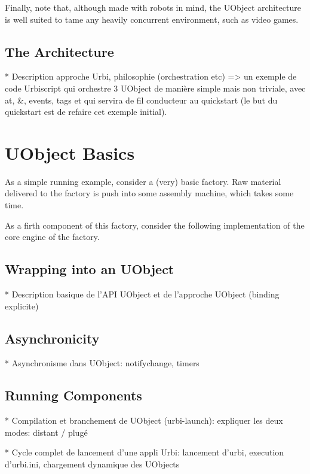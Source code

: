 Finally, note that, although made with robots in mind, the UObject
architecture is well suited to tame any heavily concurrent
environment, such as video games.

\subsection{The \urbi Architecture}

\begin{todo}
  * Description approche Urbi, philosophie (orchestration etc) => un
  exemple de code Urbiscript qui orchestre 3 UObject de manière simple
  mais non triviale, avec at, \&, events, tags et qui servira de fil
  conducteur au quickstart (le but du quickstart est de refaire cet
  exemple initial).
\end{todo}

\section{UObject Basics}

As a simple running example, consider a (very) basic factory.  Raw
material delivered to the factory is push into some assembly machine,
which takes some time.

As a firth component of this factory, consider the following
implementation of the core engine of the factory.
\newcommand{\factoryDir}{\uobjectsDir/factory/factory.uob}



\subsection{Wrapping into an UObject}
\begin{todo}
  * Description basique de l'API UObject et de l'approche UObject
  (binding explicite)
\end{todo}




\subsection{Asynchronicity}
\begin{todo}
  * Asynchronisme dans UObject: notifychange, timers
\end{todo}

\subsection{Running Components}
\begin{todo}
  * Compilation et branchement de UObject (urbi-launch): expliquer les
  deux modes: distant / plugé

  * Cycle complet de lancement d'une appli Urbi: lancement d'urbi,
  execution d'urbi.ini, chargement dynamique des UObjects
\end{todo}

